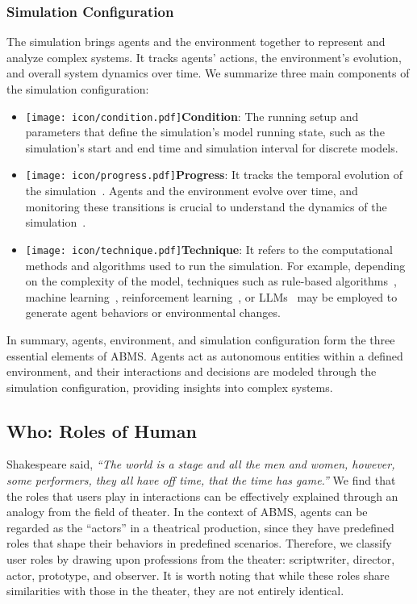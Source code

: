 \subsubsection{Simulation Configuration}
The simulation brings agents and the environment together to represent and analyze complex systems.
It tracks agents' actions, the environment's evolution, and overall system dynamics over time.
We summarize three main components of the simulation configuration:
\begin{itemize}
    \item \texttt{[image: icon/condition.pdf]}\textbf{Condition}: The running setup and parameters that define the simulation's model running state, such as the simulation's start and end time and simulation interval for discrete models.
    \item \texttt{[image: icon/progress.pdf]}\textbf{Progress}: It tracks the temporal evolution of the simulation~\cite{chen2023agentversefacilitatingmultiagentcollaboration}.
    Agents and the environment evolve over time, and monitoring these transitions is crucial to understand the dynamics of the simulation~\cite{pan2024agentcoordvisuallyexploringcoordination}.
    \item \texttt{[image: icon/technique.pdf]}\textbf{Technique}: It refers to the computational methods and algorithms used to run the simulation.
    For example, depending on the complexity of the model, techniques such as rule-based algorithms~\cite{NEURIPS2021_86e8f7ab}, machine learning~\cite{https://doi.org/10.1111/exsy.13325}, reinforcement learning~\cite{vinyals_grandmaster_2019}, or LLMs~\cite{10.1145/3586183.3606763} may be employed to generate agent behaviors or environmental changes.
\end{itemize}

In summary, agents, environment, and simulation configuration form the three essential elements of ABMS. 
Agents act as autonomous entities within a defined environment, and their interactions and decisions are modeled through the simulation configuration, providing insights into complex systems. 

\subsection{Who: Roles of Human}
Shakespeare said, \textit{``The world is a stage and all the men and women, however, some performers, they all have off time, that the time has game.''}
We find that the roles that users play in interactions can be effectively explained through an analogy from the field of theater.
In the context of ABMS, agents can be regarded as the ``actors'' in a theatrical production, since they have predefined roles that shape their behaviors in predefined scenarios.
Therefore, we classify user roles by drawing upon professions from the theater: scriptwriter, director, actor, prototype, and observer.
It is worth noting that while these roles share similarities with those in the theater, they are not entirely identical.

